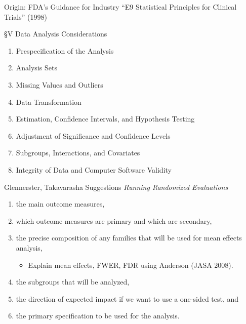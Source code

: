\documentclass{beamer}
\begin{document}
\begin{frame}{Origin: FDA's Guidance for Industry}
``E9 Statistical Principles for Clinical Trials'' (1998)
\href{http://www.fda.gov/downloads/drugs/guidancecomplianceregulatoryinformation/guidances/ucm073137.pdf}{}

\S V Data Analysis Considerations
\begin{enumerate}
\item Prespecification of the Analysis
\item Analysis Sets
\item Missing Values and Outliers
\item Data Transformation
\item Estimation, Confidence Intervals, and Hypothesis Testing
\item Adjustment of Significance and Confidence Levels
\item Subgroups, Interactions, and Covariates
\item Integrity of Data and Computer Software Validity
\end{enumerate}
\end{frame}


\begin{frame}{Glennerster, Takavarasha Suggestions}
\textit{Running Randomized Evaluations}
\begin{enumerate}[<.->]
\def\labelenumi{\arabic{enumi}.}
\item
  the main outcome measures,
\item
  which outcome measures are primary and which are secondary,
\item
  the precise composition of any families that will be used for mean
  effects analysis,
  \begin{itemize}
  \item Explain mean effects, FWER, FDR using Anderson (JASA 2008).
  \end{itemize}
\item
  the subgroups that will be analyzed,
\item
  the direction of expected impact if we want to use a one-sided test,
  and
\item
  the primary specification to be used for the analysis.
\end{enumerate}
\end{frame}
\end{document}
